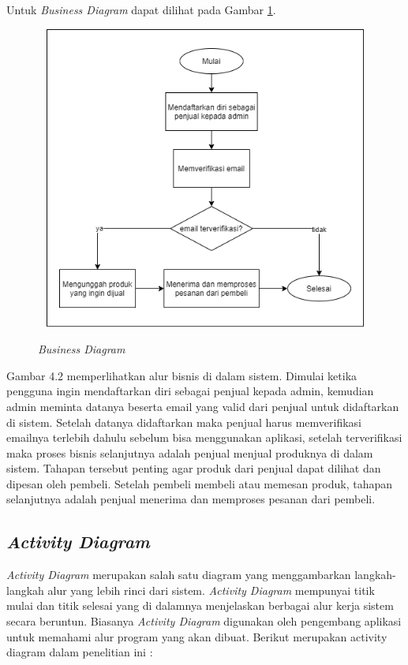 Untuk \textit{Business Diagram} dapat dilihat pada Gambar \ref{bisnis_diagram}.

\begin{figure}[H]
	\centering
	{\includegraphics [width = 12cm, height= 10cm]{gambar/bisnis diagram baru}}
	\caption{\textit{Business Diagram}}
	\label{bisnis_diagram}
\end{figure}

Gambar 4.2 memperlihatkan alur bisnis di dalam sistem. Dimulai ketika pengguna ingin mendaftarkan diri sebagai penjual kepada admin, kemudian admin meminta datanya beserta email yang valid dari penjual untuk didaftarkan di sistem. Setelah datanya didaftarkan maka penjual harus memverifikasi emailnya terlebih dahulu sebelum bisa menggunakan aplikasi, setelah terverifikasi maka proses bisnis selanjutnya adalah penjual menjual produknya di dalam sistem. Tahapan tersebut penting agar produk dari penjual dapat dilihat dan dipesan oleh pembeli. Setelah pembeli membeli atau memesan produk, tahapan selanjutnya adalah penjual menerima dan memproses pesanan dari pembeli.
	
\subsection{\textit{Activity Diagram}}
\textit{Activity Diagram} merupakan salah satu diagram yang menggambarkan langkah-langkah alur yang lebih rinci dari sistem. \textit{Activity Diagram} mempunyai titik mulai dan titik selesai yang di dalamnya menjelaskan berbagai alur kerja sistem secara beruntun. Biasanya \textit{Activity
Diagram} digunakan oleh pengembang aplikasi untuk memahami alur program yang akan dibuat. Berikut merupakan activity diagram dalam penelitian ini :

